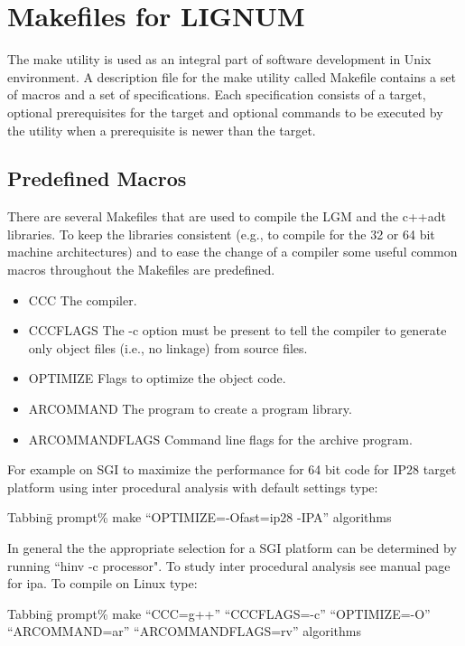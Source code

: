 \section{Makefiles for LIGNUM}

The make utility  is used as an integral  part of software development
in Unix environment.   A description file for the  make utility called
Makefile contains  a set of macros  and a set  of specifications. Each
specification  consists of  a target,  optional prerequisites  for the
target  and optional commands  to be  executed by  the utility  when a
prerequisite is newer than the target.

\subsection{Predefined Macros}

There are several  Makefiles that are used to compile  the LGM and the
c++adt libraries.  To keep  the libraries consistent (e.g., to compile
for the 32 or 64 bit  machine architectures) and to ease the change of
a  compiler some  useful common  macros throughout  the  Makefiles are
predefined.

\begin{itemize}
\item CCC The compiler.
\item CCCFLAGS The  -c option  must  be present  to tell  the compiler  to
  generate  only object files  (i.e., no  linkage) from  source files.
\item OPTIMIZE Flags to optimize the object code.
\item ARCOMMAND The program to create a program library.
\item ARCOMMANDFLAGS Command line flags for the archive program. 
\end{itemize}
For example on SGI to maximize the performance for 64 bit code for IP28
target platform using inter procedural analysis with default settings type:
\begin{tabbing}
Tabbing\=\kill 
\>prompt\% make ``OPTIMIZE=-Ofast=ip28 -IPA'' algorithms
\end{tabbing}

In general  the the  appropriate selection for  a SGI platform  can be
determined by running  ``hinv -c processor". To study inter procedural
analysis see manual page for ipa. To compile on Linux type:
\begin{tabbing}
Tabbing\=\kill 
\>prompt\% make ``CCC=g++'' ``CCCFLAGS=-c'' ``OPTIMIZE=-O'' \\
\>``ARCOMMAND=ar''  ``ARCOMMANDFLAGS=rv'' algorithms 
\end{tabbing}

